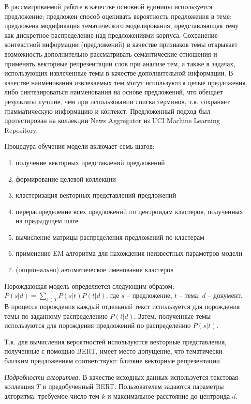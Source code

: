 В рассматриваемой работе в качестве основной единицы используется предложение; предложен способ оценивать вероятность предложения в теме; предложена модификация тематического моделирования, представляющая тему как дискретное распределение над предложениями корпуса. Сохранение контекстной информации (предложений) в качестве признаков темы открывает возможность дополнительно рассматривать семантические отношения и применять векторные репрезентации слов при анализе тем, а также в задачах, использующих извлеченные темы в качестве дополнительной информации. В качестве наименования извлекаемых тем могут используются целые предложения, либо синтезироваться наименования на основе предложений, что обещает результаты лучшие, чем при использовании списка терминов, т.к. сохраняет грамматическую информацию и контекст. Предложенный подход был протестирован на коллекции News Aggregator из UCI Machine Learning Repository.

Процедура обучения модели включает семь шагов:
\begin{enumerate}
    \item получение векторных представлений предложений
    \item формирование целевой коллекции
    \item кластеризация векторных представлений предложений
    \item перераспределение всех предложений по центроидам кластеров, полученных на предыдущем шаге
    \item вычисление матрицы распределения предложений по кластерам 
    \item применение EM-алгоритма для нахождения неизвестных параметров модели
    \item (опционально) автоматическое именование кластеров
\end{enumerate}

Порождающая модель определяется следующим образом: $P(s|d) = \sum_{t \in T}P(s|t)P(t|d)$, где $s$ -- предложение, $t$ -- тема, $d$ -- документ. В процессе порождения каждый отдельный текст используется для порождения темы по заданному распределению $P(t|d)$. Затем, полученные темы используются для порождения предложений по распределению $P(s|t)$. 

Т.к. для вычисления вероятностей используются векторные представления, полученные с помощью BERT, имеет место допущение, что тематически близким предложениям соответствуют близкие векторные репрезентации.

\textit{Подробности алгоритма.} В качестве исходных данных используется текстовая коллекция $T$ и предобученный BERT. Пользователем задаются параметры алгоритма: требуемое число тем $k$ и максимальное расстояние до центроида $d$.

